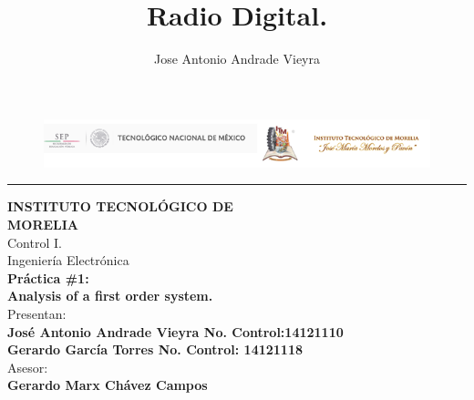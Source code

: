 \documentclass[12pt,a4paper]{article}
\author{Jose Antonio Andrade Vieyra}
\title{Radio Digital.}
\begin{document}
\begin{titlepage}
\begin{figure}[h!]
\centering
\includegraphics[scale=1]{LOGO.png}
\end{figure}
\hspace{1.3cm}\rule{14.5cm}{3pt} \hspace{-16.5cm}
\hspace{0.43cm} \hspace{0.43cm} \vspace{-19cm}
\begin{center}
\hspace{1.3cm} {\bf{\fontsize{20pt}{20pt} \selectfont INSTITUTO TECNOLÓGICO DE}}\\[0.5cm]
\hspace{1.3cm} {\bf{\fontsize{20pt}{20pt} \selectfont MORELIA}}\\[2cm]
\hspace{1.3cm} {\fontsize{20pt}{20pt} \selectfont Control I.}\\[1cm]
\hspace{1.3cm} {\fontsize{20pt}{20pt} \selectfont Ingeniería Electrónica}\\[1cm]
\hspace{1.3cm} {\bf{\fontsize{18pt}{18pt} \selectfont Práctica \#1:}}\\[0.5cm]
\hspace{1.3cm} {\bf{\fontsize{18pt}{18pt} \selectfont Analysis of a first order system.}}\\[1.5cm]
\hspace{1.3cm} {\fontsize{16pt}{16pt} \selectfont Presentan:}\\[0.8cm]
\hspace{1.3cm} {\bf{\fontsize{14pt}{14pt} \selectfont José Antonio Andrade Vieyra No. Control:14121110}}\\[0.5cm]
\hspace{1.3cm} {\bf{\fontsize{14pt}{14pt} \selectfont Gerardo García Torres No. Control: 14121118}}\\[1cm]
\hspace{1.3cm} {\fontsize{16pt}{16pt} \selectfont Asesor:}\\[0.5cm]
\hspace{1.3cm} {\bf{\fontsize{14pt}{14pt} \selectfont Gerardo Marx Chávez Campos}}
\end{center}   
\vspace{1.8cm}\hspace{1.3cm}
\end{titlepage}
\end{document}
